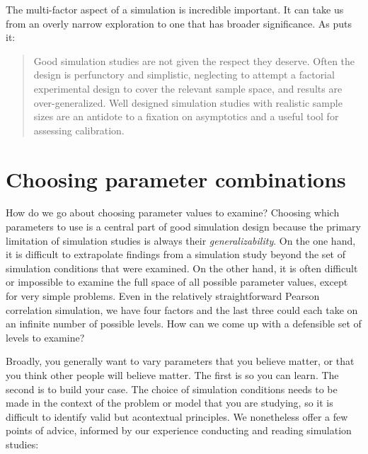 \documentclass[
]{book}
\begin{document}
The multi-factor aspect of a simulation is incredible important.
It can take us from an overly narrow exploration to one that has broader significance.
As \citet{little2013praise} puts it:

\begin{quote}
Good simulation studies are not given the respect they deserve. Often the design is perfunctory and simplistic, neglecting to attempt a factorial experimental design to cover the relevant sample space, and results are over-generalized. Well designed simulation studies with realistic sample sizes are an antidote to a ﬁxation on asymptotics and a useful tool for assessing calibration.
\end{quote}

\section{Choosing parameter combinations}\label{choosing-parameter-combinations}

How do we go about choosing parameter values to examine?
Choosing which parameters to use is a central part of good simulation design because the primary limitation of simulation studies is always their \emph{generalizability}.
On the one hand, it is difficult to extrapolate findings from a simulation study beyond the set of simulation conditions that were examined. On the other hand, it is often difficult or impossible to examine the full space of all possible parameter values, except for very simple problems.
Even in the relatively straightforward Pearson correlation simulation, we have four factors and the last three could each take on an infinite number of possible levels.
How can we come up with a defensible set of levels to examine?

Broadly, you generally want to vary parameters that you believe matter, or that you think other people will believe matter.
The first is so you can learn.
The second is to build your case.
The choice of simulation conditions needs to be made in the context of the problem or model that you are studying, so it is difficult to identify valid but acontextual principles.
We nonetheless offer a few points of advice, informed by our experience conducting and reading simulation studies:
\end{document}
